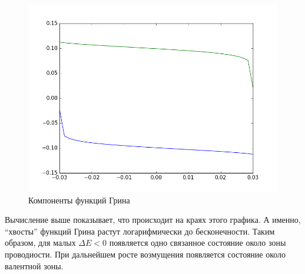 \documentclass{article}
\begin{document}
\begin{figure}[h]
    \centering
    \includegraphics[width=0.8\linewidth]{green_functions.png}
    \caption{Компоненты функций Грина}
\end{figure}

Вычисление выше показывает, что происходит на краях этого графика. А именно, ``хвосты'' 
функций Грина растут логарифмически до бесконечности.
Таким образом, для малых $\Delta E < 0$ появляется одно связанное состояние около 
зоны проводиости. При дальнейшем росте возмущения появляется состояние около валентной зоны.
\end{document}
